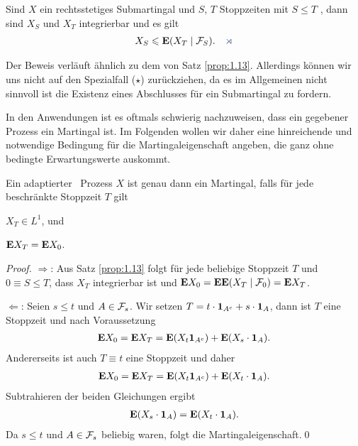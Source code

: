 \begin{prop}
\label{prop:1.16}
Sind $X$ ein rechtsstetiges Submartingal und $S$, $T$ Stoppzeiten mit $S\le T$
\fs, dann sind $X_S$ und $X_T$ integrierbar und es gilt 
\begin{align*}
X_S \le \E(X_T\mid\FF_S).\fish
\end{align*}
\end{prop}

Der Beweis verläuft ähnlich zu dem von Satz \ref{prop:1.13}. Allerdings können
wir uns nicht auf den Spezialfall ($\star$) zurückziehen, da es im Allgemeinen
nicht sinnvoll ist die Existenz eines Abschlusses für ein Submartingal zu
fordern.

In den Anwendungen ist es oftmals schwierig nachzuweisen, dass ein gegebener
Prozess ein Martingal ist. Im Folgenden wollen wir daher eine hinreichende und
notwendige Bedingung für die Martingaleigenschaft angeben, die ganz ohne
bedingte Erwartungswerte auskommt.


\begin{prop}
\label{prop:1.17}
Ein adaptierter \cadlag\ Prozess $X$ ist genau dann ein Martingal, falls für
jede beschränkte Stoppzeit $T$ gilt
\begin{equivenum}
\item $X_T \in L^1$, und
\item $\mathbf{E} X_T=\mathbf{E} X_0$.\fish
\end{equivenum}
\end{prop}

\begin{proof}
$\Rightarrow$: Aus Satz \ref{prop:1.13} folgt für jede beliebige Stoppzeit $T$
und $0\equiv S\le T$, dass $X_T$ integrierbar ist und $\mathbf{E} X_0 = \mathbf{E} \mathbf{E}(X_T\mid
\mathcal{F}_0) = \mathbf{E} X_T$.

$\Leftarrow$: Seien $s\le t$ und $A\in\mathcal{F}_s$. Wir setzen $T= t\cdot \mathbf{1}_{A^c} +
s\cdot \mathbf{1}_{A}$, dann ist $T$ eine Stoppzeit und nach Voraussetzung
\begin{align*}
\mathbf{E} X_0 = \mathbf{E} X_T = \mathbf{E} (X_t \mathbf{1}_{A^c}) + \mathbf{E}(X_s\cdot \mathbf{1}_{A}).
\end{align*}
Andererseits ist auch $T\equiv t$ eine Stoppzeit und daher
\begin{align*}
\mathbf{E} X_0 = \mathbf{E} X_T = \mathbf{E} (X_t \mathbf{1}_{A^c}) + \mathbf{E}(X_t\cdot \mathbf{1}_{A}).
\end{align*}
Subtrahieren der beiden Gleichungen ergibt
\begin{align*}
\mathbf{E}(X_s\cdot \mathbf{1}_{A}) = \mathbf{E}(X_t\cdot \mathbf{1}_{A}).
\end{align*}
Da $s\le t$ und $A\in\mathcal{F}_s$ beliebig waren, folgt die Martingaleigenschaft.\qed
\end{proof}

